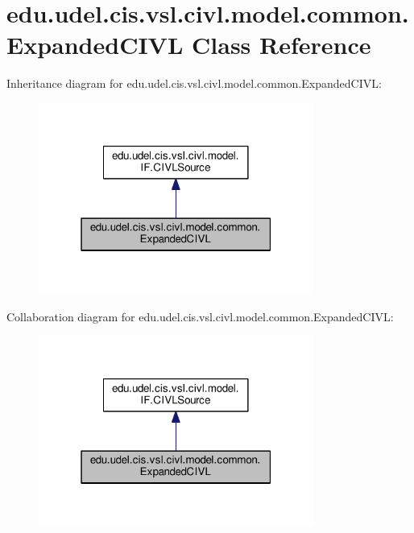 \hypertarget{classedu_1_1udel_1_1cis_1_1vsl_1_1civl_1_1model_1_1common_1_1ExpandedCIVL}{}\section{edu.\+udel.\+cis.\+vsl.\+civl.\+model.\+common.\+Expanded\+C\+I\+V\+L Class Reference}
\label{classedu_1_1udel_1_1cis_1_1vsl_1_1civl_1_1model_1_1common_1_1ExpandedCIVL}


Inheritance diagram for edu.\+udel.\+cis.\+vsl.\+civl.\+model.\+common.\+Expanded\+C\+I\+V\+L\+:
\nopagebreak
\begin{figure}[H]
\begin{center}
\leavevmode
\includegraphics[width=256pt]{classedu_1_1udel_1_1cis_1_1vsl_1_1civl_1_1model_1_1common_1_1ExpandedCIVL__inherit__graph}
\end{center}
\end{figure}


Collaboration diagram for edu.\+udel.\+cis.\+vsl.\+civl.\+model.\+common.\+Expanded\+C\+I\+V\+L\+:
\nopagebreak
\begin{figure}[H]
\begin{center}
\leavevmode
\includegraphics[width=256pt]{classedu_1_1udel_1_1cis_1_1vsl_1_1civl_1_1model_1_1common_1_1ExpandedCIVL__coll__graph}
\end{center}
\end{figure}
